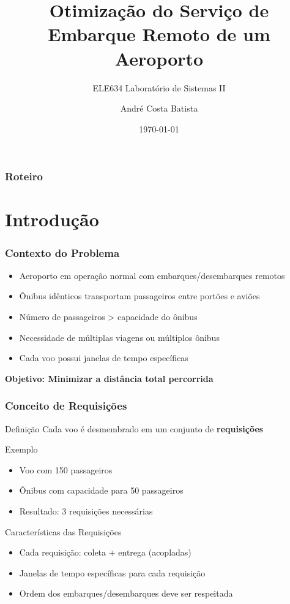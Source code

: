\documentclass[10pt]{beamer}
\title[Otimização de Embarque Remoto]{Otimização do Serviço de Embarque Remoto de um Aeroporto}
\subtitle{ELE634 Laboratório de Sistemas II}
\author[André Batista]{André Costa Batista}
\institute[ELE634]{Universidade Federal de Minas Gerais\\Escola de Engenharia\\Departamento de Engenharia Elétrica}
\date{\today}
\begin{document}
\frame{\titlepage}

\begin{frame}
\frametitle{Roteiro}
\tableofcontents
\end{frame}

\section{Introdução}

\begin{frame}
\frametitle{Contexto do Problema}
\begin{itemize}
    \item Aeroporto em operação normal com embarques/desembarques remotos
    \item Ônibus idênticos transportam passageiros entre portões e aviões
    \item Número de passageiros > capacidade do ônibus
    \item Necessidade de múltiplas viagens ou múltiplos ônibus
    \item Cada voo possui janelas de tempo específicas
\end{itemize}

\vspace{0.5cm}
\begin{center}
\textbf{Objetivo: Minimizar a distância total percorrida}
\end{center}
\end{frame}

\begin{frame}
\frametitle{Conceito de Requisições}
\begin{block}{Definição}
Cada voo é desmembrado em um conjunto de \textbf{requisições}
\end{block}

\begin{exampleblock}{Exemplo}
\begin{itemize}
    \item Voo com 150 passageiros
    \item Ônibus com capacidade para 50 passageiros
    \item Resultado: 3 requisições necessárias
\end{itemize}
\end{exampleblock}

\begin{alertblock}{Características das Requisições}
\begin{itemize}
    \item Cada requisição: coleta + entrega (acopladas)
    \item Janelas de tempo específicas para cada requisição
    \item Ordem dos embarques/desembarques deve ser respeitada
\end{itemize}
\end{alertblock}
\end{frame}
\end{document}
